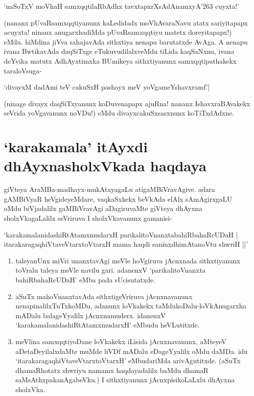 \begin{shloka}
`naSoTxV moVhaH samxqqtilaRbAdhx tavxtapxrXsAdAnamxyA\char'263 cuyxta!'\label{91}
\end{shloka}

(nananx pUvaRsamxqqtiyanunx kaLedidadx moVhAvaraNavu atatx sariyitapapx acuyxta! ninanx anugarxhadiMda pUvaRsamxqqtiyu matetx doreyitapapx!) eMdu. hiMdina jiVva sahajavAda sithxtiya nenapu barutatxde AvAga. A nenapu ivana BwtikavAda daqSiTxge eTukuvudilalxveMdu tiLida kaqSaNxnu, ivana deYvika matutx AdhAyxtimxka BUmikeya sithxtiyanunx samxqqtipathakekx taraloVsuga-

\begin{shloka}
`divayxM dadAmi teV cakuSxH pashayx meV yoVgameYshavxramf'|\label{91b}
\end{shloka}

(ninage divayx daqSiTxyanunx koDuvenapapx ajuRna! nananx IshavxraBAvakekx seVrida yoVgavanunx noVDu!) eMdu divayxcakuSxsasxnunx koTiTxdAdxne.

\section*{`karakamala' itAyxdi dhAyxnasholxVkada haqdaya}

giVteya AraMBa-madhayx-mukAtxyagaLu atigaMBiVravAgive. adara gAMBiVyaR heVgideyeMdare, vaqkaSxkekx beVkAda elAlx sAmAgirxgaLU oMdu biVjadalilx gaMBiVravAgi aDagiruvaMte giVteya dhAyxna sholxVkagaLalilx seVriruva I sholxVkavanunx gamanisi-

\begin{shloka}
`karakamalanidashiRtAtamxmudarxH parikalitoVnanxtabahiRbahaRcUDaH |\label{92}\\
itarakaragaqhiVtaveVtarxtoVtarxH mama haqdi saninxdhimAtanoVtu shwriH ||'
\end{shloka}

\begin{enumerate}
\item taleyanUnx miVri unanxtavAgi meVle hoVgiruva jAcnxnada sithxtiyanunx toVralu taleya meVle navilu gari. adanenxV `parikalitoVnanxta bahiRbahaRcUDaH' eMba pada sUcisutatxde.
\item aSuTx mahoVnanxtavAda sithxtigeVriruva jAcnxnavanunx nenapinalilxTuTxkoMDu, adanunx loVkakekx taMdukoDalu-loVkAnugarxha mADalu balageYyalilx jAcnxnamuderx. idanenxV `karakamalanidashiRtAtamxmudarxH' eMbudu heVLutitxde.
\item meVlina samxqqtiyoDane loVkakekx iLisida jAcnxnavanunx, aMteyeV aDetaDeyilalxdaMte muMde liVDf mADalu eDageYyalilx oMdu daMDa. idu `itarakaragaqhiVtaveVtarxtoVtarxH' eMbudariMda arivAgutitxde. (aSuTx dhamaRhotatx shwriyu namamx haqdayadalilx baMdu dhamaR saMsAthxpakanAgabeVku.) I sithxtiyanunx jAcnxpisikoLaLxlu dhAyxna sholxVka.
\end{enumerate}

